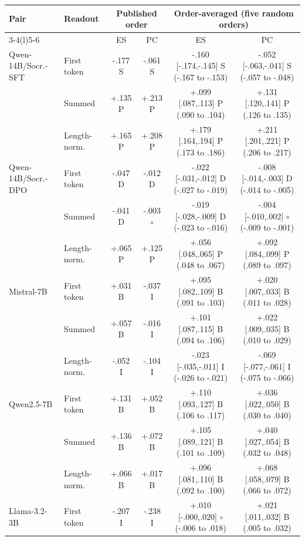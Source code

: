 \begin{table}[t]
\centering\scriptsize
\setlength{\tabcolsep}{3pt}
\begin{tabular}{@{}llcccc@{}}
\toprule
Pair & Readout & \multicolumn{2}{c}{Published order} & \multicolumn{2}{c}{Order-averaged (five random orders)} \\
\cmidrule(lr){3-4}\cmidrule(l){5-6} & & ES & PC & ES & PC \\
\midrule
Qwen-14B/Socr.-SFT & First token & -.177 S & -.061 S & -.160 [-.174,-.145] S (-.167 to -.153) & -.052 [-.063,-.041] S (-.057 to -.048) \\
 & Summed & +.135 P & +.213 P & +.099 [.087,.113] P (.090 to .104) & +.131 [.120,.141] P (.126 to .135) \\
 & Length-norm. & +.165 P & +.208 P & +.179 [.164,.194] P (.173 to .186) & +.211 [.201,.221] P (.206 to .217) \\
\addlinespace[1pt]
Qwen-14B/Socr.-DPO & First token & -.047 D & -.012 D & -.022 [-.031,-.012] D (-.027 to -.019) & -.008 [-.014,-.003] D (-.014 to -.005) \\
 & Summed & -.041 D & -.003 $\circ$ & -.019 [-.028,-.009] D (-.023 to -.016) & -.004 [-.010,.002] $\circ$ (-.009 to -.001) \\
 & Length-norm. & +.065 P & +.125 P & +.056 [.048,.065] P (.048 to .067) & +.092 [.084,.099] P (.089 to .097) \\
\addlinespace[1pt]
Mistral-7B & First token & +.031 B & -.037 I & +.095 [.082,.109] B (.091 to .103) & +.020 [.007,.033] B (.011 to .028) \\
 & Summed & +.057 B & -.016 I & +.101 [.087,.115] B (.094 to .106) & +.022 [.009,.035] B (.010 to .029) \\
 & Length-norm. & -.052 I & -.104 I & -.023 [-.035,-.011] I (-.026 to -.021) & -.069 [-.077,-.061] I (-.075 to -.066) \\
\addlinespace[1pt]
Qwen2.5-7B & First token & +.131 B & +.052 B & +.110 [.093,.127] B (.106 to .117) & +.036 [.022,.050] B (.030 to .040) \\
 & Summed & +.136 B & +.072 B & +.105 [.089,.121] B (.101 to .109) & +.040 [.027,.054] B (.032 to .048) \\
 & Length-norm. & +.066 B & +.017 B & +.096 [.081,.110] B (.092 to .100) & +.068 [.058,.079] B (.066 to .072) \\
\addlinespace[1pt]
Llama-3.2-3B & First token & -.207 I & -.238 I & +.010 [-.000,.020] $\circ$ (-.006 to .018) & +.021 [.011,.032] B (.005 to .032) \\

\end{tabular}
\end{table}
